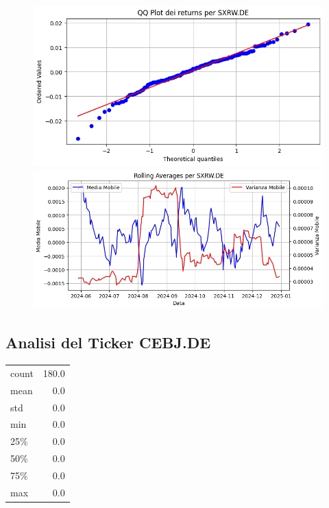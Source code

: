 \documentclass{article}%
\begin{document}
%


\begin{figure}[htbp]%
\begin{minipage}{0.48\textwidth}%
\includegraphics[width=\linewidth]{immagini_tickers/SXRW.DE_qq_plot.png}%
\end{minipage}%
\begin{minipage}{0.48\textwidth}%
\includegraphics[width=\linewidth]{immagini_tickers/SXRW.DE_rolling_averages.png}%
\end{minipage}%
\end{figure}

%
\subsection*{Analisi del Ticker CEBJ.DE}%
\label{subsec:AnalisidelTickerCEBJ.DE}%
\begin{tabular}{lr}%
count&180.0\\%
mean&0.0\\%
std&0.0\\%
min&0.0\\%
25\%&0.0\\%
50\%&0.0\\%
75\%&0.0\\%
max&0.0\\%
\end{tabular}%
\end{document}
